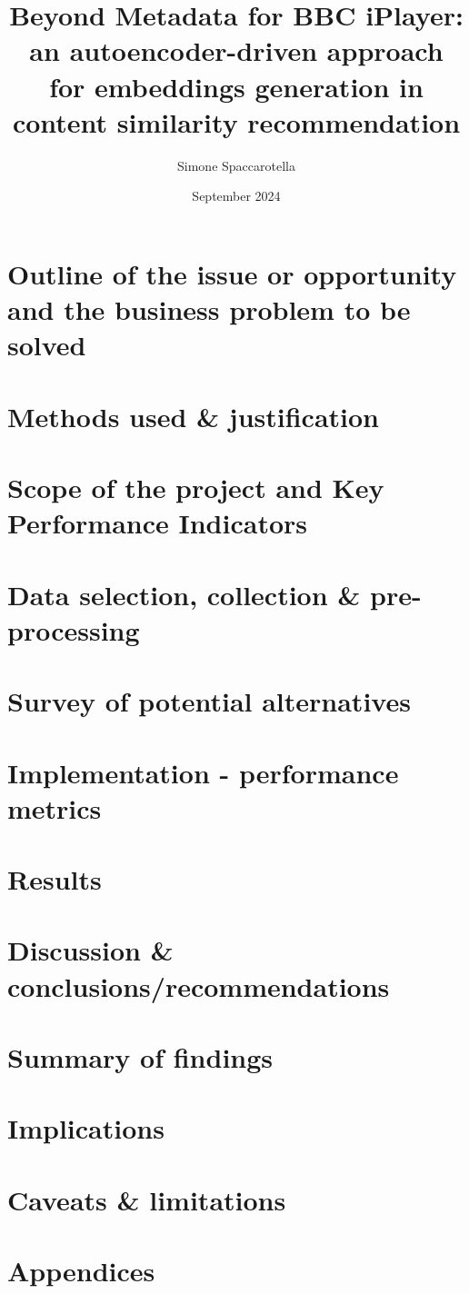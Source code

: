 \documentclass[12pt,a4paper]{article}
\begin{document}
\title{Beyond Metadata for BBC iPlayer:\\an autoencoder-driven approach for embeddings generation in content similarity recommendation}
\author{Simone Spaccarotella}
\date{September 2024}

\maketitle
\tableofcontents



\section{Outline of the issue or opportunity and the business problem to be solved}

\section{Methods used \& justification}

\section{Scope of the project and Key Performance Indicators}

\section{Data selection, collection \& pre-processing}

\section{Survey of potential alternatives}

\section{Implementation - performance metrics}

\section{Results}

\section{Discussion \& conclusions/recommendations}

\section{Summary of findings}

\section{Implications}

\section{Caveats \& limitations}

\section{Appendices}



\end{document}
